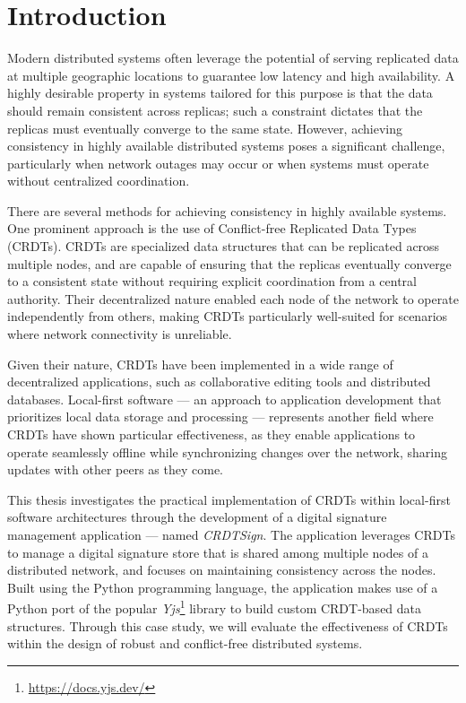 \chapter{Introduction}

Modern distributed systems often leverage the potential of serving replicated data at multiple geographic
locations to guarantee low latency and high availability. A highly desirable property in systems tailored for this
purpose is that the data should remain consistent across replicas; such a constraint dictates that the replicas
must eventually converge to the same state. However, achieving consistency in highly available distributed systems
poses a significant challenge, particularly when network outages may occur or when systems must operate without
centralized coordination. 

There are several methods for achieving consistency in highly available systems. One prominent approach is the use
of Conflict-free Replicated Data Types (CRDTs). CRDTs are specialized data structures that can be replicated across
multiple nodes, and are capable of ensuring that the replicas eventually converge to a consistent state without
requiring explicit coordination from a central authority. Their decentralized nature enabled each node of the
network to operate independently from others, making CRDTs particularly well-suited for scenarios where network
connectivity is unreliable.

Given their nature, CRDTs have been implemented in a wide range of decentralized applications, such as
collaborative editing tools and distributed databases. Local-first software --- an approach to application
development that prioritizes local data storage and processing --- represents another field where CRDTs have shown
particular effectiveness, as they enable applications to operate seamlessly offline while synchronizing changes
over the network, sharing updates with other peers as they come.

This thesis investigates the practical implementation of CRDTs within local-first software architectures through the
development of a digital signature management application --- named \textit{CRDTSign}. The application leverages CRDTs
to manage a digital signature store that is shared among multiple nodes of a distributed network, and focuses on
maintaining consistency across the nodes. Built using the Python programming language, the application makes use of a
Python port of the popular \textit{Yjs}\footnote{\url{https://docs.yjs.dev/}} library to build custom CRDT-based data
structures. Through this case study, we will evaluate the effectiveness of CRDTs within the design of robust and
conflict-free distributed systems.
